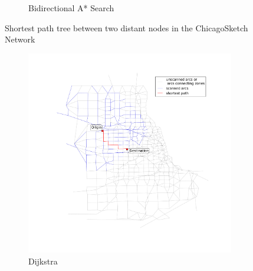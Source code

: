 \begin{figure}
\begin{subfigure}{.5\textwidth}
        \caption{Bidirectional A* Search}
        \label{fig:chicago_astar_bidirect}
    \end{subfigure}
    \vspace{1em}
    \caption{Shortest path tree between two distant nodes in the ChicagoSketch Network}
    \label{fig:long_sptree}
\end{figure}

\begin{figure}
    \centering
    \begin{subfigure}{.5\textwidth}
        \centering
        \includegraphics[width=\textwidth,trim=120px 120px 48px 120px,clip]{img/chicago_dijkstra2}
        \caption{Dijkstra}
        \label{fig:chicago_dijkstra2}
    \end{subfigure}%
    \begin{subfigure}{.5\textwidth}
        \centering

\end{subfigure}
\end{figure}
